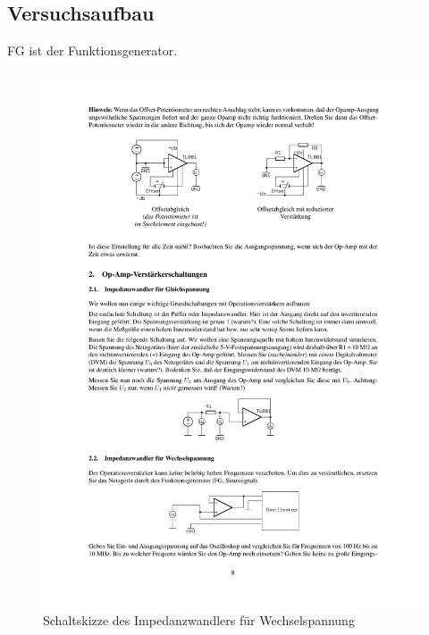 \documentclass[12pt,a4paper]{article}
\begin{document}
\subsection{Versuchsaufbau}

FG ist der Funktionsgenerator.

\begin{figure}[H] 
  \centering
    \includegraphics[trim = 10mm 40mm 10mm 230mm, clip, scale = 1]{ep4_14[Page8].pdf}
  	\caption[Schaltskizze des Impedanzwandlers für Wechselspannung]{Schaltskizze des Impedanzwandlers für Wechselspannung\footnotemark}
  \label{fig:1}
\end{figure}
\end{document}
